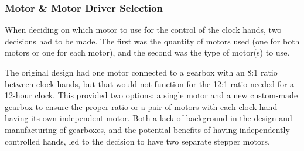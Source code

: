 \documentclass[11pt]{article}
\begin{document}
\subsubsection{Motor \& Motor Driver Selection}
\label{MotorDesign}


When deciding on which motor to use for the control of the clock hands, two decisions had to be made.
The first was the quantity of motors used (one for both motors or one for each motor), and the second was the type of motor(s) to use. 

The original design had one motor connected to a gearbox with an 8:1 ratio between clock hands, but that would not function for the 12:1 ratio needed for a 12-hour clock.
This provided two options: a single motor and a new custom-made gearbox to ensure the proper ratio or a pair of motors with each clock hand having its own independent motor. 
Both a lack of background in the design and manufacturing of gearboxes, and the potential benefits of having independently controlled hands, led to the decision to have two separate stepper motors.
\end{document}
